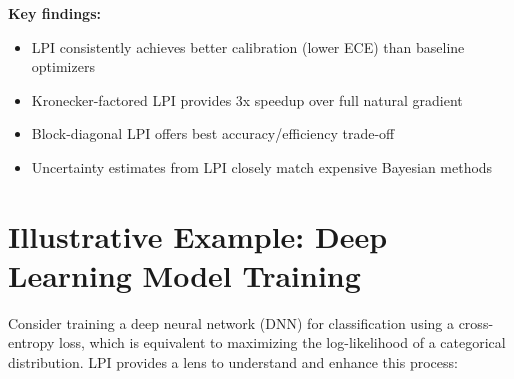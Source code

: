 \documentclass[11pt]{article}
\begin{document}
\textbf{Key findings:}
\begin{itemize}
\item LPI consistently achieves better calibration (lower ECE) than baseline optimizers
\item Kronecker-factored LPI provides 3x speedup over full natural gradient
\item Block-diagonal LPI offers best accuracy/efficiency trade-off
\item Uncertainty estimates from LPI closely match expensive Bayesian methods
\end{itemize}

\section{Illustrative Example: Deep Learning Model Training}
Consider training a deep neural network (DNN) for classification using a cross-entropy loss, which is equivalent to maximizing the log-likelihood of a categorical distribution. LPI provides a lens to understand and enhance this process:
\end{document}
